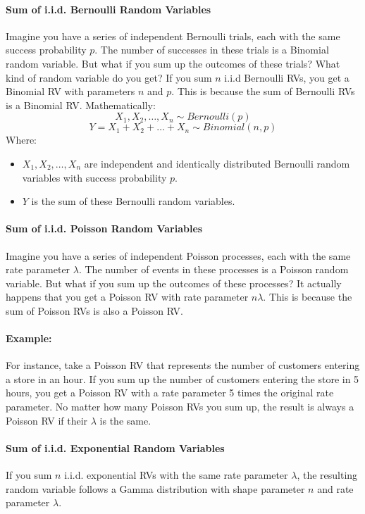 \documentclass[a4paper]{article}
\begin{document}
\paragraph{Sum of i.i.d. Bernoulli Random Variables}
Imagine you have a series of independent Bernoulli trials, each with the same success probability \(p\). The number of successes in these trials is a Binomial random variable. But what if you sum up the outcomes of these trials? What kind of random variable do you get?
If you sum $n$ i.i.d Bernoulli RVs, you get a Binomial RV with parameters \(n\) and \(p\). This is because the sum of Bernoulli RVs is a Binomial RV.
Mathematically: 
$$X_1, X_2, \ldots, X_n \sim Bernoulli(p)$$
$$Y = X_1 + X_2 + \ldots + X_n \sim Binomial(n, p)$$
Where: \begin{itemize}
    \item \(X_1, X_2, \ldots, X_n\) are independent and identically distributed Bernoulli random variables with success probability \(p\).
    \item \(Y\) is the sum of these Bernoulli random variables. 
    
\end{itemize}

\paragraph{Sum of i.i.d. Poisson Random Variables}
Imagine you have a series of independent Poisson processes, each with the same rate parameter \(\lambda\). The number of events in these processes is a Poisson random variable. But what if you sum up the outcomes of these processes?
It actually happens that you get a Poisson RV with rate parameter \(n\lambda\). This is because the sum of Poisson RVs is also a Poisson RV.
\paragraph{Example:} For instance, take a Poisson RV that represents the number of customers entering a store in an hour. If you sum up the number of customers entering the store in 5 hours, you get a Poisson RV with a rate parameter 5 times the original rate parameter.
No matter how many Poisson RVs you sum up, the result is always a Poisson RV if their $\lambda$ is the same.

\paragraph{Sum of i.i.d. Exponential Random Variables}
If you sum $n$ i.i.d. exponential RVs with the same rate parameter $\lambda$, the resulting random variable follows a Gamma distribution with shape parameter $n$ and rate parameter $\lambda$. 
\end{document}
